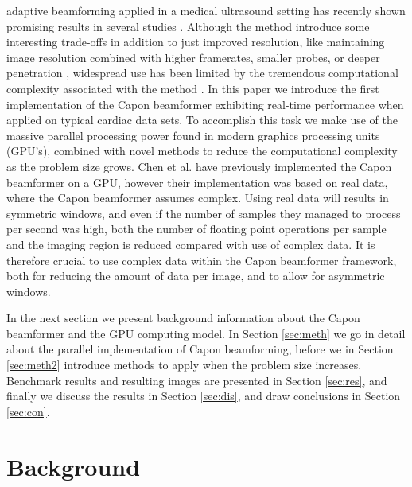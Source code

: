 \documentclass[journal]{IEEEtran}
\begin{document}
 adaptive beamforming applied in a medical ultrasound setting has recently shown promising results in several studies \cite{Synnevag2007, Austeng2008, Vignon2008, Viola, Mehdizadeh2012}. Although the method introduce some interesting trade-offs in addition to just improved resolution, like maintaining image resolution combined with higher framerates, smaller probes, or deeper penetration \cite{Synnevag2009}, widespread use has been limited by the tremendous computational complexity associated with the method \cite{So2011}.  In this paper we introduce the first implementation of the Capon beamformer exhibiting real-time performance when applied on typical cardiac data sets. To accomplish this task we make use of the massive parallel processing power found in modern graphics processing units (GPU's), combined with novel methods to reduce the computational complexity as the problem size grows. Chen et al. \cite{Chen2011a, Chen2011} have previously implemented the Capon beamformer on a GPU, however their implementation was based on real data, where the Capon beamformer assumes complex. Using real data will results in symmetric windows, and even if the number of samples they managed to process per second was high, both the number of floating point operations per sample and the imaging region is reduced compared with use of complex data. It is therefore crucial to use complex data within the Capon beamformer framework, both for reducing the amount of data per image, and to allow for asymmetric windows.

In the next section we present background information about the Capon beamformer and the GPU computing model. In Section \ref{sec:meth} we go in detail about the parallel implementation of Capon beamforming, before we in Section \ref{sec:meth2} introduce methods to apply when the problem size increases. Benchmark results and resulting images are presented in Section \ref{sec:res}, and finally we discuss the results in Section \ref{sec:dis}, and draw conclusions in Section \ref{sec:con}. 

\section{Background}
\end{document}
